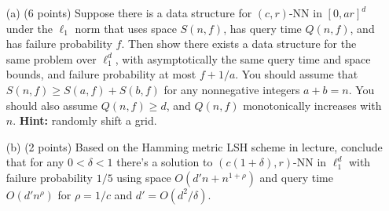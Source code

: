 \documentclass[12pt]{article}
\begin{document}
\begin{itemize}
\item[(a)] (6 points) Suppose there is a data structure for $(c, r)$-NN in $[0, ar]^d$ under the $\ell_1$ norm that uses space $S(n, f)$, has query time $Q(n, f)$, and has failure probability $f$. Then show there exists a data structure for the same problem over $\ell_1^d$, with asymptotically the same query time and space bounds, and failure probability at most $f + 1/a$. You should assume that $S(n,f) \ge S(a,f) + S(b,f)$ for any nonnegative integers $a+b=n$. You should also assume $Q(n,f)\ge d$, and $Q(n,f)$ monotonically increases with $n$. \textbf{Hint:} randomly shift a grid.
\item[(b)] (2 points) Based on the Hamming metric LSH scheme in lecture, conclude that for any $0<\delta<1$ there's a solution to $(c(1+\delta),r)$-NN in $\ell_1^d$ with failure probability $1/5$ using space $O(d'n + n^{1+\rho})$ and query time $O(d'n^\rho)$ for $\rho = 1/c$ and $d' = O(d^2/\delta)$.

\end{itemize}
\end{document}

